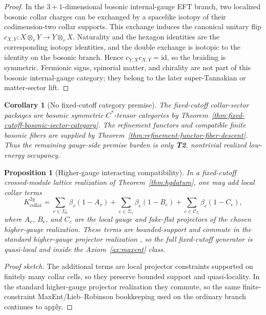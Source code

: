 \documentclass[11pt]{article}
\newtheorem{corollary}[theorem]{Corollary}
\newtheorem{proposition}[theorem]{Proposition}
\begin{document}
\begin{proof}
In the \(3+1\)-dimensional bosonic internal-gauge EFT branch, two localized bosonic collar
charges can be exchanged by a spacelike isotopy of their codimension-two collar supports. This
exchange induces the canonical unitary flip \(c_{X,Y}:X\otimes_r Y\to Y\otimes_r X\). Naturality
and the hexagon identities are the corresponding isotopy identities, and the double exchange is
isotopic to the identity on the bosonic branch. Hence \(c_{Y,X}c_{X,Y}=\mathrm{id}\), so the
braiding is symmetric. Fermionic signs, spinorial matter, and chirality are not part of this
bosonic internal-gauge category; they belong to the later super-Tannakian or matter-sector lift.
\end{proof}

\begin{corollary}[No fixed-cutoff category premise]\label{cor:no-fixed-cutoff-category-premise}
The fixed-cutoff collar-sector packages are bosonic symmetric \(C^*\)-tensor categories by
Theorem~\ref{thm:fixed-cutoff-bosonic-sector-category}. The refinement functors and compatible
finite bosonic fibers are supplied by Theorem~\ref{thm:refinement-functor-fiber-descent}. Thus the
remaining gauge-side premise burden is only \textbf{T2}, nontrivial realized low-energy occupancy.
\end{corollary}

\begin{proposition}[Higher-gauge interacting compatibility]\label{prop:hginteracting}
In a fixed-cutoff crossed-module lattice realization of Theorem~\ref{thm:hgdatum}, one may add local collar terms
\[
K_{\mathrm{collar}}^{2g}
=
\sum_{v\in\Sigma_0}\beta_v(1-A_v)
+
\sum_{e\in\Sigma_1}\beta_e(1-B_e)
+
\sum_{c\in\mathcal C_\Sigma}\beta_c(1-C_c),
\]
where \(A_v\), \(B_e\), and \(C_c\) are the local gauge and fake-flat projectors of the chosen higher-gauge realization. These terms are bounded-support and commute in the standard higher-gauge projector realization \cite{bullivant17}, so the full fixed-cutoff generator is quasi-local and inside the Axiom~\ref{ax:maxent} class.
\end{proposition}

\begin{proof}[Proof sketch]
The additional terms are local projector constraints supported on finitely many collar cells, so they preserve bounded support and quasi-locality. In the standard higher-gauge projector realization they commute, so the same finite-constraint MaxEnt/Lieb--Robinson bookkeeping used on the ordinary branch continues to apply.
\end{proof}
\end{document}
